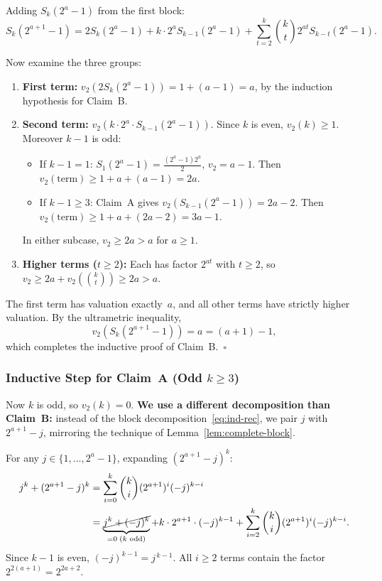 \documentclass[12pt,a4paper]{article}
\theoremstyle{plain}
\theoremstyle{definition}
\begin{document}
Adding $S_k(2^a-1)$ from the first block:
\begin{equation}\label{eq:ind-rec}
  S_k(2^{a+1} - 1) = 2 S_k(2^a-1) + k \cdot 2^a S_{k-1}(2^a-1)
    + \sum_{t=2}^{k} \binom{k}{t} 2^{at} S_{k-t}(2^a-1).
\end{equation}

Now examine the three groups:

\begin{enumerate}[label=(\arabic*), nosep]
  \item \textbf{First term:} $v_2(2 S_k(2^a-1)) = 1 + (a-1) = a$,
    by the induction hypothesis for Claim~B.

  \item \textbf{Second term:} $v_2(k \cdot 2^a \cdot S_{k-1}(2^a-1))$.
    Since $k$ is even, $v_2(k) \ge 1$.  Moreover $k-1$ is odd:
    \begin{itemize}[nosep]
      \item If $k-1 = 1$: $S_1(2^a-1) = \frac{(2^a-1)2^a}{2}$,
        $v_2 = a-1$.  Then $v_2(\text{term}) \ge 1 + a + (a-1) = 2a$.
      \item If $k-1 \ge 3$: Claim~A gives $v_2(S_{k-1}(2^a-1)) = 2a-2$.
        Then $v_2(\text{term}) \ge 1 + a + (2a-2) = 3a-1$.
    \end{itemize}
    In either subcase, $v_2 \ge 2a > a$ for $a \ge 1$.

  \item \textbf{Higher terms ($t \ge 2$):} Each has factor $2^{at}$ with
    $t \ge 2$, so $v_2 \ge 2a + v_2(\binom{k}{t}) \ge 2a > a$.
\end{enumerate}

The first term has valuation exactly~$a$, and all other terms have strictly
higher valuation.  By the ultrametric inequality,
\[
  v_2(S_k(2^{a+1} - 1)) = a = (a+1) - 1,
\]
which completes the inductive proof of Claim~B.~\hfill$\square$

\subsubsection{Inductive Step for Claim~A (Odd $k \ge 3$)}\label{sec:ind-claimA}

Now $k$ is odd, so $v_2(k) = 0$.
\textbf{We use a different decomposition than Claim~B:} instead of the block
decomposition~\eqref{eq:ind-rec}, we pair $j$ with $2^{a+1}-j$, mirroring the
technique of Lemma~\ref{lem:complete-block}.

For any $j \in \{1, \dots, 2^{a}-1\}$, expanding $(2^{a+1}-j)^k$:
\begin{align*}
  j^k + (2^{a+1}-j)^k
  &= \sum_{i=0}^{k} \binom{k}{i} (2^{a+1})^i (-j)^{k-i} \\
  &= \underbrace{\cancel{j^k + (-j)^k}}_{=0\;(\text{$k$ odd})}
     + k \cdot 2^{a+1} \cdot (-j)^{k-1}
     + \sum_{i=2}^{k} \binom{k}{i} (2^{a+1})^i (-j)^{k-i}.
\end{align*}
Since $k-1$ is even, $(-j)^{k-1} = j^{\,k-1}$.  All $i \ge 2$ terms contain
the factor $2^{2(a+1)} = 2^{2a+2}$.
\end{document}
